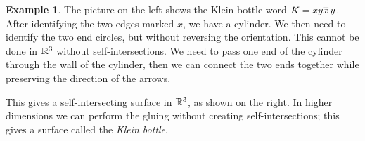 \documentclass[reqno]{amsart}
\theoremstyle{definition}
\newtheorem{example}[theorem]{Example}
\begin{document}
\begin{example}\label{eg-klein-word}
 The picture on the left shows the Klein bottle word $K=xy\overline{x}\,y$.
 After identifying the two edges marked $x$, we have a cylinder.  We
 then need to identify the two end circles, but without reversing the
 orientation.  This cannot be done in $\mathbb{R}^3$ without
 self-intersections.  We need to pass one end of the cylinder through
 the wall of the cylinder, then we can connect the two ends together
 while preserving the direction of the arrows.  
 \begin{center}
 \end{center} 
 This gives a self-intersecting surface in $\mathbb{R}^3$, as shown on the
 right.  In higher dimensions we can perform the gluing without
 creating self-intersections; this gives a surface called the
 \emph{Klein bottle}.
\end{example}
\end{document}
